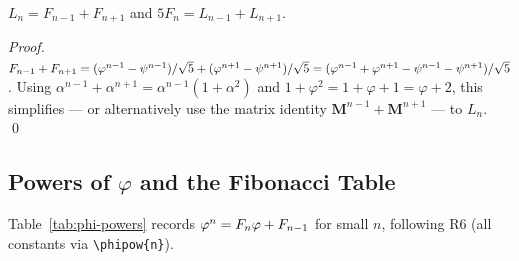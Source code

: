 \begin{corollary}\label{cor:fib-lucas}
\(L_n = F_{n-1} + F_{n+1}\) and \(5F_n = L_{n-1}+L_{n+1}\).
\end{corollary}

\begin{proof}
\(F_{n-1}+F_{n+1} = (\varphi^{n-1}-\psi^{n-1})/\sqrt{5}
  + (\varphi^{n+1}-\psi^{n+1})/\sqrt{5}
  = (\varphi^{n-1}+\varphi^{n+1} - \psi^{n-1}-\psi^{n+1})/\sqrt{5}\).
Using \(\alpha^{n-1}+\alpha^{n+1} = \alpha^{n-1}(1+\alpha^2)\) and
\(1+\varphi^2 = 1+\varphi+1 = \varphi+2\), this simplifies — or alternatively
use the matrix identity \(\mathbf{M}^{n-1}+\mathbf{M}^{n+1}\) — to \(L_n\).
\qed
\end{proof}

\subsection{Powers of \(\varphi\) and the Fibonacci Table}\label{subsec:ch7-powers}

Table~\ref{tab:phi-powers} records \(\varphi^{n} = F_n\varphi + F_{n-1}\)
for small \(n\), following R6 (all constants via \texttt{\textbackslash{}phipow\{n\}}).

\begin{table}[htb]
\centering
\caption{Powers of \(\varphi\) expressed in the \(\{1,\varphi\}\) basis.
\(F_n\) and \(F_{n-1}\) are read from the last two columns.}
\label{tab:phi-powers}
\end{table}

